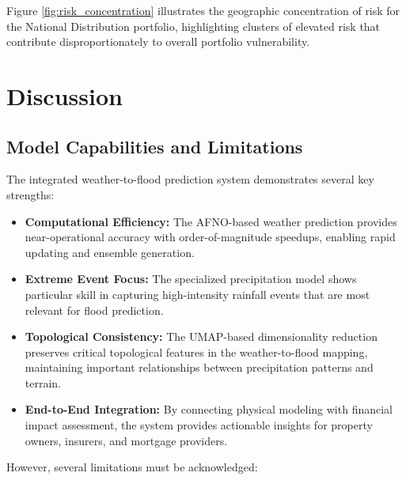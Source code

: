 \documentclass{article}
\begin{document}
Figure \ref{fig:risk_concentration} illustrates the geographic concentration of risk for the National Distribution portfolio, highlighting clusters of elevated risk that contribute disproportionately to overall portfolio vulnerability.

\section{Discussion}
\subsection{Model Capabilities and Limitations}

The integrated weather-to-flood prediction system demonstrates several key strengths:

\begin{itemize}
    \item \textbf{Computational Efficiency:} The AFNO-based weather prediction provides near-operational accuracy with order-of-magnitude speedups, enabling rapid updating and ensemble generation.
    
    \item \textbf{Extreme Event Focus:} The specialized precipitation model shows particular skill in capturing high-intensity rainfall events that are most relevant for flood prediction.
    
    \item \textbf{Topological Consistency:} The UMAP-based dimensionality reduction preserves critical topological features in the weather-to-flood mapping, maintaining important relationships between precipitation patterns and terrain.
    
    \item \textbf{End-to-End Integration:} By connecting physical modeling with financial impact assessment, the system provides actionable insights for property owners, insurers, and mortgage providers.
\end{itemize}

However, several limitations must be acknowledged:
\end{document}
